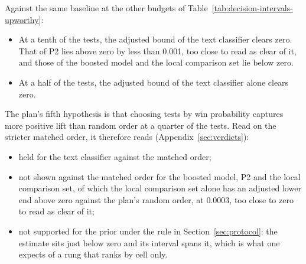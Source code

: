 Against the same baseline at the other budgets of Table~\ref{tab:decision-intervals-upworthy}:
\begin{itemize}
\item At a tenth of the tests, the adjusted bound of the text classifier clears zero. That of P2 lies above zero by less than 0.001, too close to read as clear of it, and those of the boosted model and the local comparison set lie below zero.
\item At a half of the tests, the adjusted bound of the text classifier alone clears zero.
\end{itemize}
The plan's fifth hypothesis is that choosing tests by win probability captures more positive lift than random order at a quarter of the tests. Read on the stricter matched order, it therefore reads (Appendix~\ref{sec:verdicts}):
\begin{itemize}
\item held for the text classifier against the matched order;
\item not shown against the matched order for the boosted model, P2 and the local comparison set, of which the local comparison set alone has an adjusted lower end above zero against the plan's random order, at 0.0003, too close to zero to read as clear of it;
\item not supported for the prior under the rule in Section~\ref{sec:protocol}: the estimate sits just below zero and its interval spans it, which is what one expects of a rung that ranks by cell only.
\end{itemize}

